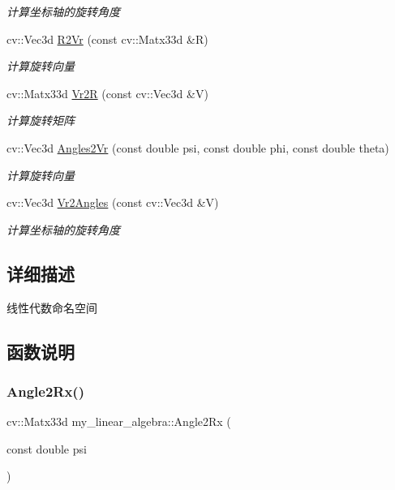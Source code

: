 \begin{DoxyCompactItemize}
\begin{DoxyCompactList}\small\item\em 计算坐标轴的旋转角度 \end{DoxyCompactList}\item 
cv\+::\+Vec3d \mbox{\hyperlink{namespacemy__linear__algebra_acd3b6b29042ea3d6ceafc74ace2975ce}{R2\+Vr}} (const cv\+::\+Matx33d \&R)
\begin{DoxyCompactList}\small\item\em 计算旋转向量 \end{DoxyCompactList}\item 
cv\+::\+Matx33d \mbox{\hyperlink{namespacemy__linear__algebra_a3db83bdbd9660f8f1f408d4fb4a65dae}{Vr2R}} (const cv\+::\+Vec3d \&V)
\begin{DoxyCompactList}\small\item\em 计算旋转矩阵 \end{DoxyCompactList}\item 
cv\+::\+Vec3d \mbox{\hyperlink{namespacemy__linear__algebra_aae6c65bdd21ffebdf8e1a89072bbb39b}{Angles2\+Vr}} (const double psi, const double phi, const double theta)
\begin{DoxyCompactList}\small\item\em 计算旋转向量 \end{DoxyCompactList}\item 
cv\+::\+Vec3d \mbox{\hyperlink{namespacemy__linear__algebra_aa7bec138549bc2d25e3ac6c9e664b18d}{Vr2\+Angles}} (const cv\+::\+Vec3d \&V)
\begin{DoxyCompactList}\small\item\em 计算坐标轴的旋转角度 \end{DoxyCompactList}\end{DoxyCompactItemize}


\subsection{详细描述}
线性代数命名空间 

\subsection{函数说明}
\mbox{\label{namespacemy__linear__algebra_af25af21d6df34ed01c3b167b301f14de}} 
\subsubsection{\texorpdfstring{Angle2Rx()}{Angle2Rx()}}
{\footnotesize\ttfamily cv\+::\+Matx33d my\+\_\+linear\+\_\+algebra\+::\+Angle2\+Rx (\begin{DoxyParamCaption}\item[{const double}]{psi }\end{DoxyParamCaption})}



